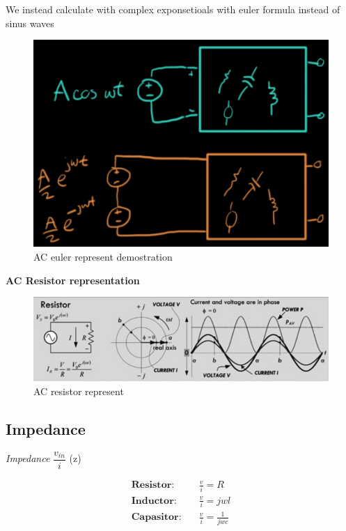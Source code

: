We instead calculate with complex exponsetioals with euler formula instead of sinus waves
\begin{figure}[h]
    \centering
    \includegraphics[width=13cm]{image/AC-euler-representation-demostration.png}
    \caption{AC euler represent demostration}
\end{figure}

\vspace{10mm}
\textbf{AC Resistor representation}
\begin{figure}[h]
    \centering
    \includegraphics[width=13cm]{image/AC_resistor_representation.png}
    \caption{AC resistor represent}
\end{figure}


\newpage
\subsection{Impedance}
\textit{Impedance} $\dfrac{v_{in}}{i}$ (z)

\begin{align*}
  \textbf{Resistor}: &\quad \frac{v}{i}=R \\
  \textbf{Inductor}: &\quad \frac{v}{i}=jwl \\
  \textbf{Capasitor}: &\quad \frac{v}{i}=\frac{1}{jwc}\\
\end{align*}


